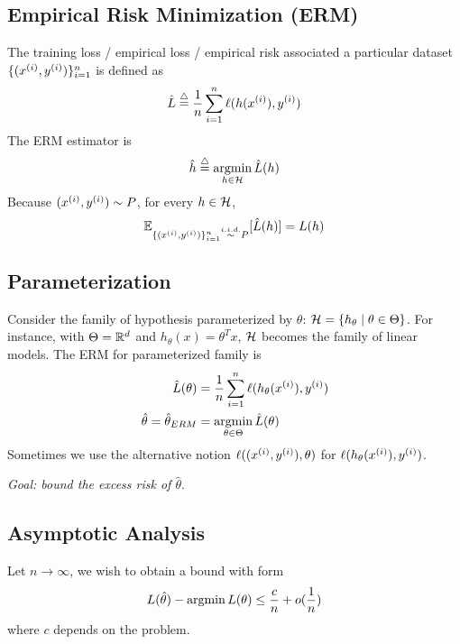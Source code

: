 \documentclass[11pt]{article}
\newcommand{\thetahat}[0]{\hat{\theta}}
\newcommand{\defas}[0]{\overset{\triangle}{=}}
\begin{document}
	\subsection{Empirical Risk Minimization (ERM)}
	\par The training loss / empirical loss / empirical risk associated a particular dataset $\{(x^{(i)}, y^{(i)})\}_{i=1}^n$ is defined as
	\begin{align}
		\hat{L} \defas \frac{1}{n} \sum_{i=1}^n \ell(h(x\upi), y\upi)
	\end{align}
	The ERM estimator is
	\begin{align}
		\hat{h} \defas \argmin_{h \in \mc{H}} \hat{L}(h)
	\end{align}
	Because $(x^{(i)}, y^{(i)}) \sim P$, for every $h \in \mathcal{{H}}$,
	\begin{align}
		\mathbb{E}_{\{(x^{(i)}, y^{(i)})\}_{i=1}^n \overset{i.i.d.}{\sim} P} [\hat{L}(h)] = L(h)
	\end{align}

	\subsection{Parameterization}
	\par Consider the family of hypothesis parameterized by $\theta$: $\mathcal{{H}} = \{h_\theta \mid \theta \in \Theta\}$. For instance, with $\Theta = \mathbb{R}^d$ and $h_\theta(x) = \theta^T x$, $\mathcal{{H}}$ becomes the family of linear models. The ERM for parameterized family is
	\begin{align}
		\hat{L}(\theta) &= \frac{1}{n} \sum_{i=1}^n \ell(h_\theta(x\upi), y\upi) \\
		\thetahat = \thetahat_{ERM} &= \argmin_{\theta \in \Theta} \hat{L}(\theta)
	\end{align}
	Sometimes we use the alternative notion $\ell((x^{(i)}, y^{(i)}), \theta)$ for $\ell(h_\theta(x^{(i)}), y^{(i)})$.
	
	\emph{Goal: bound the excess risk of $\thetahat$}.
	
	\subsection{Asymptotic Analysis}
	\par Let $n \to \infty$, we wish to obtain a bound with form
	\begin{align}
		L(\thetahat) - \argmin L(\theta) \leq \frac{c}{n} + o(\frac{1}{n})
	\end{align}
	where $c$ depends on the problem.
	
\end{document}
